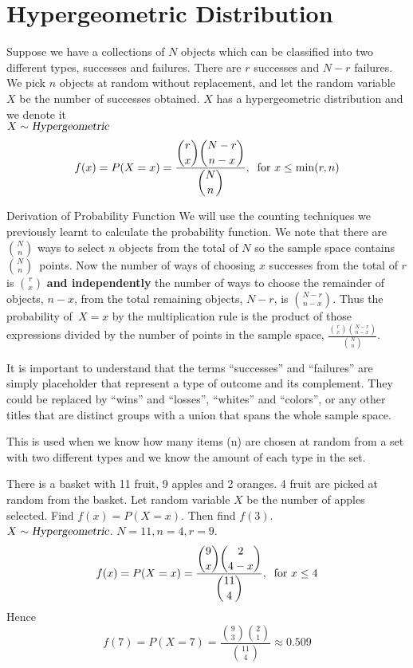 \section{Hypergeometric Distribution}
Suppose we have a collections of $N$ objects which can be classified into two different types, successes and failures. There are $r$ successes and $N -r$ failures. We pick $n$ objects at random without replacement, and let the random variable $X$ be the number of successes obtained. $X$ has a hypergeometric distribution and we denote it \\
$X\sim\operatorname{\textsl{Hypergeometric}}$
\[
    f(x) = P(X = x) =
    \frac{\displaystyle\binom{r}{x} \binom{N-r}{n-x}}{\displaystyle\binom{N}{n}},\:\text{ for } x\leq\min(r,n)
\]
\begin{theory}{Derivation of Probability Function}
We will use the counting techniques we previously learnt to calculate the probability function. We note that there are $\binom{N}{n}$ ways to select $n$ objects from the total of $N$ so the sample space contains $\binom{N}{n}$~points. Now the number of ways of choosing $x$ successes from the total of $r$ is $\binom{r}{x}$ \textbf{and independently} the number of ways to choose the remainder of objects, $n-x$, from the total remaining objects, $N - r$, is $\binom{N - r}{n - x}$. Thus the probability of~$X = x$ by the multiplication rule is the product of those expressions divided by the number of points in the sample space, $\frac{\binom{r}{x}\binom{N-r}{n-x}}{\binom{N}{n}}$.
\end{theory}
\begin{info}
It is important to understand that the terms ``successes'' and ``failures'' are simply placeholder that represent a type of outcome and its complement. They could be replaced by ``wins'' and ``losses'', ``whites'' and ``colors'', or any other titles that are distinct groups with a union that spans the whole sample space.
\end{info}
\begin{info}
    This is used when we know how many items (n) are chosen at random from a set with two different types and we know the amount of each type in the set.
\end{info}
\begin{example}
There is a basket with 11 fruit, 9 apples and 2 oranges. 4 fruit are picked at random from the basket. Let random variable $X$ be the number of apples selected. Find $f(x)=P(X=x)$. Then find $f(3)$. \\
$X\sim\operatorname{\textsl{Hypergeometric}}$. $N=11,n=4,r=9$.
\[
    f(x) = P(X = x) = \displaystyle\frac{\displaystyle\binom{9}{x} \binom{2}{4-x}} {\displaystyle\binom{11}{4}},\:\text{ for } x \leq 4
\]
Hence 
\[
    f(7) = P(X = 7) = \displaystyle\frac{\displaystyle\binom{9}{3} \binom{2}{1}} {\displaystyle\binom{11}{4}} \approx 0.509
\]
\end{example}
